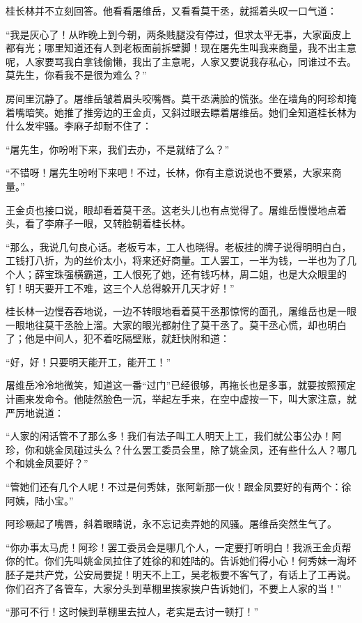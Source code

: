 \par 桂长林并不立刻回答。他看看屠维岳，又看看莫干丞，就摇着头叹一口气道：
\par “我是灰心了！从昨晚上到今朝，两条贱腿没有停过，但求太平无事，大家面皮上都有光；哪里知道还有人到老板面前拆壁脚！现在屠先生叫我来商量，我不出主意呢，人家要骂我白拿钱偷懒，我出了主意呢，人家又要说我存私心，同谁过不去。莫先生，你看我不是很为难么？”
\par 房间里沉静了。屠维岳皱着眉头咬嘴唇。莫干丞满脸的慌张。坐在墙角的阿珍却掩着嘴暗笑。她推了推旁边的王金贞，又斜过眼去瞟着屠维岳。她们全知道桂长林为什么发牢骚。李麻子却耐不住了：
\par “屠先生，你吩咐下来，我们去办，不是就结了么？”
\par “不错呀！屠先生吩咐下来吧！不过，长林，你有主意说说也不要紧，大家来商量。”
\par 王金贞也接口说，眼却看着莫干丞。这老头儿也有点觉得了。屠维岳慢慢地点着头，看了李麻子一眼，又转脸朝着桂长林。
\par “那么，我说几句良心话。老板亏本，工人也晓得。老板挂的牌子说得明明白白，工钱打八折，为的丝价太小，将来还好商量。工人罢工，一半为钱，一半也为了几个人；薛宝珠强横霸道，工人恨死了她，还有钱巧林，周二姐，也是大众眼里的钉！明天要开工不难，这三个人总得躲开几天才好！”
\par 桂长林一边慢吞吞地说，一边不转眼地看着莫干丞那惊愕的面孔，屠维岳也是一眼一眼地往莫干丞脸上溜。大家的眼光都射住了莫干丞了。莫干丞心慌，却也明白了；他是中间人，犯不着吃隔壁账，就赶快附和道：
\par “好，好！只要明天能开工，能开工！”
\par 屠维岳冷冷地微笑，知道这一番“过门”已经很够，再拖长也是多事，就要按照预定计画来发命令。他陡然脸色一沉，举起左手来，在空中虚按一下，叫大家注意，就严厉地说道：
\par “人家的闲话管不了那么多！我们有法子叫工人明天上工，我们就公事公办！阿珍，你和姚金凤碰过头么？什么罢工委员会里，除了姚金凤，还有些什么人？哪几个和姚金凤要好？”
\par “管她们还有几个人呢！不过是何秀妹，张阿新那一伙！跟金凤要好的有两个：徐阿姨，陆小宝。”
\par 阿珍噘起了嘴唇，斜着眼睛说，永不忘记卖弄她的风骚。屠维岳突然生气了。
\par “你办事太马虎！阿珍！罢工委员会是哪几个人，一定要打听明白！我派王金贞帮你的忙。你们先叫姚金凤拉住了姓徐的和姓陆的。告诉她们得小心！何秀妹一淘坏胚子是共产党，公安局要捉！明天不上工，吴老板要不客气了，有话上了工再说。你们召齐了各管车，大家分头到草棚里挨家挨户告诉她们，不要上人家的当！”
\par “那可不行！这时候到草棚里去拉人，老实是去讨一顿打！”
